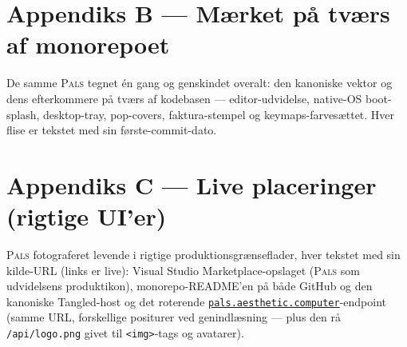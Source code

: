 \documentclass[10pt,letterpaper,twocolumn]{article}
\newcommand{\pals}{\textsc{Pals}}
\begin{document}



\newpage
\section*{Appendiks B --- Mærket på tværs af monorepoet}
\noindent De samme \pals{} tegnet én gang og genskindet overalt: den
kanoniske vektor og dens efterkommere på tværs af kodebasen ---
editor-udvidelse, native-OS boot-splash, desktop-tray, pop-covers,
faktura-stempel og keymaps-farvesættet. Hver flise er tekstet med sin
første-commit-dato.
\vspace{1.2em}



\newpage
\section*{Appendiks C --- Live placeringer (rigtige UI'er)}
\noindent \pals{} fotograferet levende i rigtige produktionsgrænseflader,
hver tekstet med sin kilde-URL (links er live): Visual Studio
Marketplace-opslaget (\pals{} som udvidelsens produktikon), monorepo-README'en
på både GitHub og den kanoniske Tangled-host og det roterende
\href{https://pals.aesthetic.computer}{\texttt{pals.aesthetic.computer}}-endpoint
(samme URL, forskellige positurer ved genindlæsning --- plus den rå
\texttt{/api/logo.png} givet til \texttt{<img>}-tags og avatarer).
\vspace{1.0em}


\end{document}

